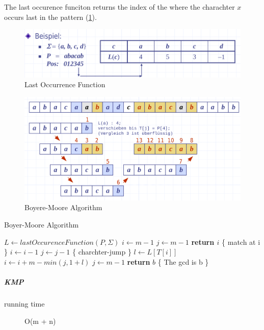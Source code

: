 \documentclass[11pt,twoside,twocolumn,landscape]{article}
\begin{document}
The last occurence funciton returns the index of the where the charachter \(x\) occurs last in the pattern (\ref{fig:org4d24d4d}).

\begin{figure}[htbp]
\centering
\includegraphics[width=.9\linewidth]{img/lastOccurrence.png}
\caption{\label{fig:org4d24d4d}Last Occurrence Function}
\end{figure}

\begin{figure}[htbp]
\centering
\includegraphics[width=.9\linewidth]{img/boyere_moore.png}
\caption{Boyere-Moore Algorithm}
\end{figure}


\begin{algorithm}
  \caption{Boyer-Moore Algorithm}
  \begin{algorithmic}[1]
    \State $L \leftarrow lastOccurenceFunction(P, \Sigma)$
    \State $i \leftarrow m - 1$
    \State $j \leftarrow m - 1$
    \Repeat
    \State \textbf{return $i$} \{ match at i \}
    \Else
    \State $i \leftarrow i - 1$
    \State $j \leftarrow j - 1$
    \EndIf
    \State \{ charchter-jump \}
    \State $l \leftarrow L[T[i]]$
    \State $i \leftarrow i + m - min(j, 1 + l)$
    \State $j \leftarrow m - 1$
    \EndIf
    \State \textbf{return} $b$ \{ The gcd is b \}
    \EndProcedure
  \end{algorithmic}
\end{algorithm}

\subparagraph{KMP}
\label{sec:org3f695eb}

\begin{description}
\item[{running time}] O(m + n)
\end{description}
\end{document}
